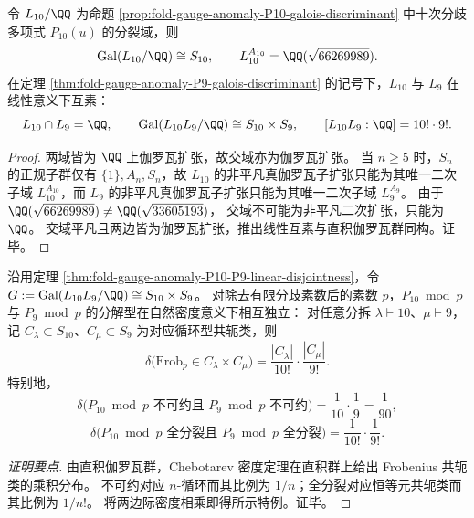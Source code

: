 

\begin{theorem}[两类分歧场的线性互素性与直积伽罗瓦群]\label{thm:fold-gauge-anomaly-P10-P9-linear-disjointness}
令 \(L_{10}/\QQ\) 为命题 \ref{prop:fold-gauge-anomaly-P10-galois-discriminant} 中十次分歧多项式 \(P_{10}(u)\) 的分裂域，则
\[
\mathrm{Gal}(L_{10}/\QQ)\cong S_{10},\qquad L_{10}^{A_{10}}=\QQ(\sqrt{66269989}).
\]
在定理 \ref{thm:fold-gauge-anomaly-P9-galois-discriminant} 的记号下，\(L_{10}\) 与 \(L_9\) 在线性意义下互素：
\[
L_{10}\cap L_9=\QQ,
\qquad
\mathrm{Gal}(L_{10}L_9/\QQ)\cong S_{10}\times S_9,
\qquad
[L_{10}L_9:\QQ]=10!\cdot 9!.
\]
\end{theorem}
\begin{proof}
两域皆为 \(\QQ\) 上伽罗瓦扩张，故交域亦为伽罗瓦扩张。
当 \(n\ge 5\) 时，\(S_n\) 的正规子群仅有 \(\{1\},A_n,S_n\)，故 \(L_{10}\) 的非平凡真伽罗瓦子扩张只能为其唯一二次子域 \(L_{10}^{A_{10}}\)，而 \(L_9\) 的非平凡真伽罗瓦子扩张只能为其唯一二次子域 \(L_9^{A_9}\)。
由于
\(
\QQ(\sqrt{66269989})\neq \QQ(\sqrt{33605193})
\)，
交域不可能为非平凡二次扩张，只能为 \(\QQ\)。
交域平凡且两边皆为伽罗瓦扩张，推出线性互素与直积伽罗瓦群同构。证毕。
\end{proof}

\begin{corollary}\label{cor:fold-gauge-anomaly-P10-P9-chebotarev-independence}
沿用定理 \ref{thm:fold-gauge-anomaly-P10-P9-linear-disjointness}，令
\(
G:=\mathrm{Gal}(L_{10}L_9/\QQ)\cong S_{10}\times S_9
\)。
对除去有限分歧素数后的素数 \(p\)，\(P_{10}\bmod p\) 与 \(P_9\bmod p\) 的分解型在自然密度意义下相互独立：
对任意分拆 \(\lambda\vdash 10\)、\(\mu\vdash 9\)，记 \(C_\lambda\subset S_{10}\)、\(C_\mu\subset S_9\) 为对应循环型共轭类，则
\[
\delta\bigl(\mathrm{Frob}_p\in C_\lambda\times C_\mu\bigr)=\frac{|C_\lambda|}{10!}\cdot\frac{|C_\mu|}{9!}.
\]
特别地，
\[
\delta\bigl(\text{$P_{10}\bmod p$ 不可约且 $P_9\bmod p$ 不可约}\bigr)=\frac{1}{10}\cdot\frac{1}{9}=\frac{1}{90},
\]
\[
\delta\bigl(\text{$P_{10}\bmod p$ 全分裂且 $P_9\bmod p$ 全分裂}\bigr)=\frac{1}{10!}\cdot\frac{1}{9!}.
\]
\end{corollary}
\begin{proof}[证明要点]
由直积伽罗瓦群，Chebotarev 密度定理在直积群上给出 Frobenius 共轭类的乘积分布。
不可约对应 \(n\)-循环而其比例为 \(1/n\)；全分裂对应恒等元共轭类而其比例为 \(1/n!\)。
将两边际密度相乘即得所示特例。证毕。
\end{proof}

